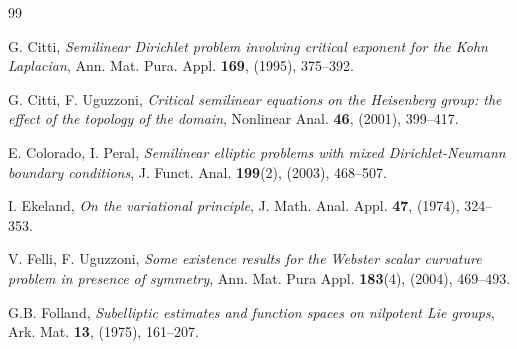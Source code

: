 \documentclass[11pt]{amsart}
\numberwithin{equation}{section} %
\theoremstyle{definition}
\begin{document}
\begin{thebibliography}{99}
	
	G. Citti,
	{\em Semilinear Dirichlet problem involving critical exponent for the Kohn Laplacian}, 
	Ann. Mat. Pura. Appl. {\bf 169}, (1995), 375--392.
	
	G. Citti, F. Uguzzoni, 
	{\em Critical semilinear equations on the Heisenberg group: the effect of the
		topology of the domain}, Nonlinear Anal. {\bf 46}, (2001), 399--417.
	
	
	E. Colorado, I. Peral, 
	{\em Semilinear elliptic problems with mixed Dirichlet-Neumann boundary conditions}, 
	J. Funct. Anal. {\bf 199}(2), (2003), 468--507.

	
	
	
	I. Ekeland,
	{\em On the variational principle},
	J. Math. Anal. Appl. {\bf 47}, (1974), 324--353.
	
	V. Felli, F. Uguzzoni, 
	{\em Some existence results for the Webster scalar curvature problem in presence of symmetry},
	Ann. Mat. Pura Appl. {\bf 183}(4), (2004), 469--493.
	
	
	G.B. Folland,
	{\em Subelliptic estimates and function spaces on nilpotent Lie groups}, 
	Ark. Mat. {\bf 13}, (1975), 161--207.
	
	
	

\end{thebibliography}
\end{document}
